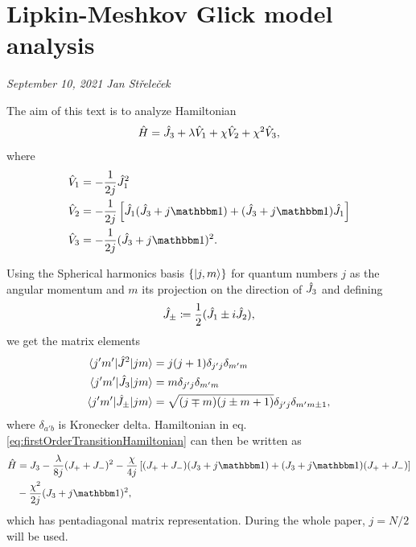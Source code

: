 \chapter{Lipkin-Meshkov Glick model analysis}
\textit{September 10, 2021\newline
Jan Střeleček\newline}

The aim of this text is to analyze Hamiltonian
\begin{equation}
    \hat{H}=\hat{J}_3+\lambda\hat V_1 +\chi \hat V_2+\chi^2 \hat V_3,
    \label{eq:firstOrderTransitionHamiltonian}
\end{equation}
where
\begin{align}
    \hat V_1 &=-\frac{1}{2j}\J_1^2\\
    \hat V_2 &= -\frac{1}{2j}\left[\J_1(\J_3+j\Id)+(\J_3+j\Id)\J_1\right]\\
    \hat V_3 &= -\frac{1}{2j}(\J_3+j\Id)^2.
\end{align}



Using the Spherical harmonics basis $\{\ket{j,m}\}$ for quantum numbers $j$ as the angular momentum and $m$ its projection on the direction of $\hat{J}_3$ and defining
\begin{equation}
    \hat{J}_\pm\coloneqq\frac{1}{2}(\hat{J}_1\pm i\hat{J}_2),
\end{equation}
we get the matrix elements
\begin{align}
    \braket{j'm'|\hat{J}^2|jm} &= j(j+1)\delta_{j'j}\delta_{m'm}\\
    \braket{j'm'|\hat{J}_3|jm} &= m \delta_{j'j}\delta_{m'm}\\
    \braket{j'm'|\hat{J}_\pm|jm} &= \sqrt{(j\mp m)(j\pm m+1)}\delta_{j'j}\delta_{m'm\pm 1},
\end{align}
where $\delta_{a'b}$ is Kronecker delta. Hamiltonian in eq. \ref{eq:firstOrderTransitionHamiltonian} can then be written as
\begin{equation}
\begin{split}
        \HH &= J_3-\frac{\lambda}{8j}(J_++J_-)^2-\frac{\chi}{4j}\left[(J_++J_-)(J_3+j\Id)+(J_3+j\Id)(J_++J_-)\right]\\
        &-\frac{\chi^2}{2j}(J_3+j\Id)^2,
\end{split}
\end{equation}
which has pentadiagonal matrix representation. During the whole paper, $j=N/2$ will be used. 

